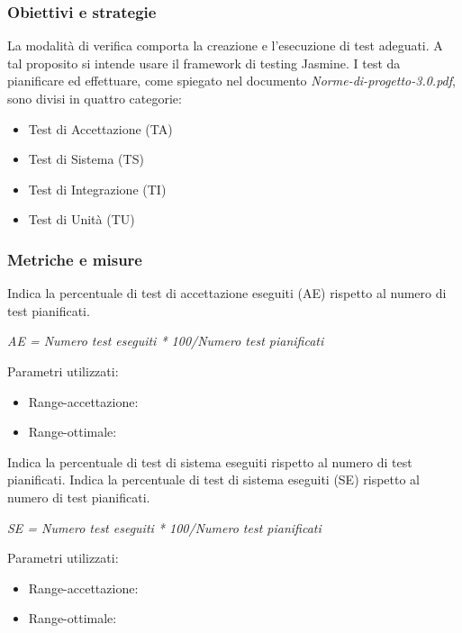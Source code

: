 \documentclass[a4paper,11pt]{article}
\begin{document}
\subsubsection{Obiettivi e strategie}
La modalità di verifica comporta la creazione e l'esecuzione di test adeguati. A tal proposito si intende usare il framework di testing Jasmine.
I test da pianificare ed effettuare, come spiegato nel documento \textit{Norme-di-progetto-3.0.pdf}, sono divisi in quattro categorie:
\begin{itemize}
\item Test di Accettazione (TA)
\item Test di Sistema (TS)
\item Test di Integrazione (TI)
\item Test di Unità (TU)
\end{itemize}

\subsubsection{Metriche e misure}
Indica la percentuale di test di accettazione eseguiti (AE) rispetto al numero di test pianificati.
\begin{center}
\textit{AE = Numero test eseguiti * 100/Numero test pianificati}
\end{center}
Parametri utilizzati: 
\begin{itemize}
	\item Range-accettazione: \begin{math}[100\%]\end{math}
\item Range-ottimale: \begin{math}[100\%]\end{math}
	\end{itemize}
Indica la percentuale di test di sistema eseguiti rispetto al numero di test pianificati.
Indica la percentuale di test di sistema eseguiti (SE) rispetto al numero di test pianificati.
\begin{center}
\textit{SE = Numero test eseguiti * 100/Numero test pianificati}
\end{center}
Parametri utilizzati: 
\begin{itemize}
	\item Range-accettazione: \begin{math}[100\%]\end{math}
\item Range-ottimale: \begin{math}[100\%]\end{math}
	\end{itemize}
\end{document}
